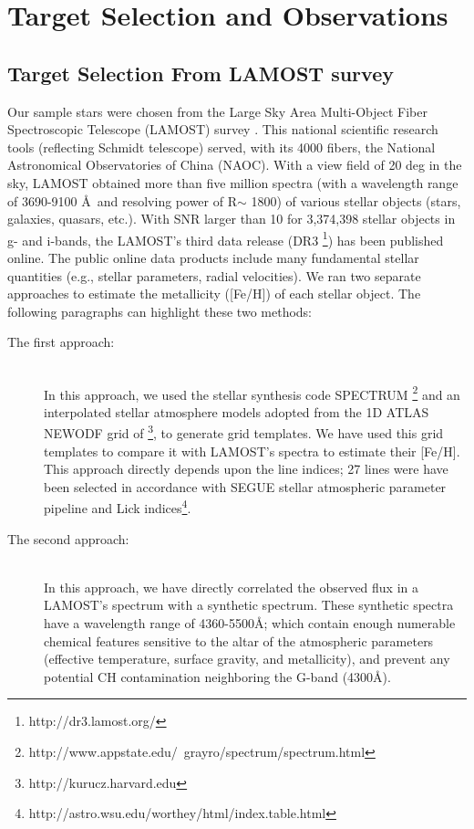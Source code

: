 \chapter{Target Selection and Observations}\label{chap:introduction}

\section{Target Selection From LAMOST survey}
Our sample stars were chosen from the Large Sky Area Multi-Object Fiber Spectroscopic Telescope (LAMOST) survey
\citep{2006ChJAA...6..265Z, 2012RAA....12..723Z, 2012RAA....12.1197C}. This national scientific research tools (reflecting Schmidt telescope) served, with its 4000 fibers, the National Astronomical Observatories of China (NAOC). With a view field of 20 deg in the sky, LAMOST obtained more than five million spectra (with a wavelength range of 3690-9100 {\AA}\, and resolving power of R$ \sim$ 1800) of various stellar objects (stars, galaxies, quasars, etc.). With SNR  larger than 10 for 3,374,398 stellar objects in g- and i-bands, the LAMOST's third data release (DR3 \footnote{http://dr3.lamost.org/}) has been published online. The public online data products include many fundamental stellar quantities (e.g., stellar parameters, radial velocities). We ran two separate approaches to estimate the metallicity ([Fe/H]) of each stellar object. The following paragraphs can highlight these two methods:


\begin{description}
  \item[The first approach:] \hfill \\ In this approach, we used the stellar synthesis code SPECTRUM \footnote{http://www.appstate.edu/~grayro/spectrum/spectrum.html} \citep{1994AJ....107..742G} and an interpolated stellar atmosphere models adopted from the 1D ATLAS NEWODF grid of \citet{2003IAUS..210P.A20C}\footnote{http://kurucz.harvard.edu}, to generate grid templates. We have used this grid templates to compare it with LAMOST's spectra to estimate their [Fe/H]. This approach directly depends upon the line indices; 27 lines were have been selected in accordance with SEGUE stellar atmospheric parameter pipeline and Lick indices\footnote{http://astro.wsu.edu/worthey/html/index.table.html}. 

  \item[The second approach:] \hfill \\ In this approach, we have directly correlated the observed flux in a LAMOST's spectrum with a synthetic spectrum. These synthetic spectra have a wavelength range of 4360-5500{\AA}; which contain enough numerable chemical features sensitive to the altar of the atmospheric parameters (effective temperature, surface gravity, and metallicity), and prevent any potential CH contamination neighboring the G-band (4300{\AA}). 
\end{description}


